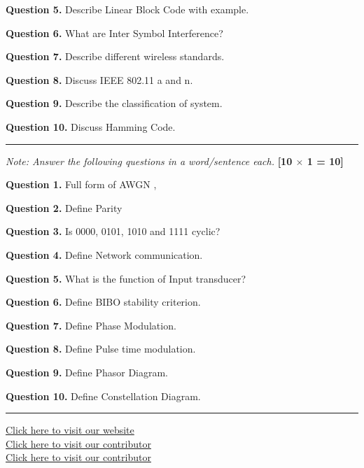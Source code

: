 \documentclass[11pt,a4paper]{article}
\begin{document}
\medskip


\noindent   \textbf{Question 5.} Describe Linear Block Code with example.

\medskip


\noindent   \textbf{Question 6.} What are Inter Symbol Interference?

\medskip


\noindent   \textbf{Question 7.} Describe different wireless standards.

\medskip


\noindent   \textbf{Question 8.} Discuss IEEE 802.11 a and n.

\medskip


\noindent   \textbf{Question 9.} Describe the classification of system.

\medskip


\noindent   \textbf{Question 10.} Discuss Hamming Code.

\bigskip


\rule{\linewidth}{0.4pt}\smallskip




\noindent   \textit{Note: Answer the following questions in a word/sentence each.} \hfill   \textbf{[10 $ \times$ 1 = 10]}

\medskip


\noindent   \textbf{Question 1.} Full form of AWGN ,

\medskip


\noindent   \textbf{Question 2.} Define Parity

\medskip


\noindent   \textbf{Question 3.} Is 0000, 0101, 1010 and 1111 cyclic?

\medskip


\noindent   \textbf{Question 4.} Define Network communication.

\medskip


\noindent   \textbf{Question 5.} What is the function of Input transducer?

\medskip


\noindent   \textbf{Question 6.} Define BIBO stability criterion.

\medskip


\noindent   \textbf{Question 7.} Define Phase Modulation.

\medskip


\noindent   \textbf{Question 8.} Define Pulse time modulation.

\medskip


\noindent   \textbf{Question 9.} Define Phasor Diagram.

\medskip


\noindent   \textbf{Question 10.} Define Constellation Diagram.

\vfill
\rule{\linewidth}{0.4pt}

\begin{center}\small
\href{https://bhu-exam.vercel.app/}{Click here to visit our website}\\[4pt]\href{https://me-aryan.vercel.app/}{Click here to visit our contributor}\\[4pt]\href{https://quashan-me.vercel.app/}{Click here to visit our contributor}
\end{center}
\end{document}
